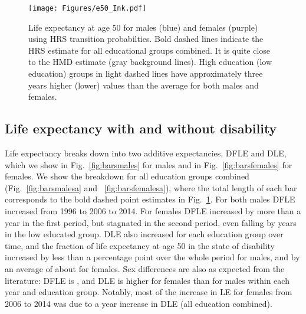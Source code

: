 \begin{figure}[ht!]
\centering
\texttt{[image: Figures/e50\_Ink.pdf]}
\caption{Life expectancy at age 50 for males (blue) and females (purple) using HRS transition probabilties. Bold dashed lines indicate the HRS estimate for all educational groups combined. It is quite close to the HMD estimate (gray background lines). High education (low education) groups in light dashed lines have approximately three years higher (lower) values than the average for both males and females.}
\label{fig:e50}
\end{figure}

\subsection{Life expectancy with and without disability}

Life expectancy breaks down into two additive expectancies, DFLE and DLE, which we show in Fig.~\ref{fig:barsmales} for males and in Fig.~\ref{fig:barsfemales} for females. We show the breakdown for all education groups combined (Fig.~\ref{fig:barsmalesa} and ~\ref{fig:barsfemalesa}), where the total length of each bar corresponds to the bold dashed point estimates in Fig.~\ref{fig:e50}. For both males DFLE increased from 1996 to 2006 to 2014. For females DFLE increased by more than a year in the first period, but stagnated in the second period, even falling by  years in the low educated group. DLE also increased for each education group over time, and the fraction of life expectancy at age 50 in the state of disability increased by less than a percentage point over the whole period for males, and by an average of about  for females. Sex differences are also as expected from the literature: DFLE is , and DLE is  higher for females than for males within each year and education group. Notably, most of the increase in LE for females from 2006 to 2014 was due to a  year increase in DLE (all education combined). 

